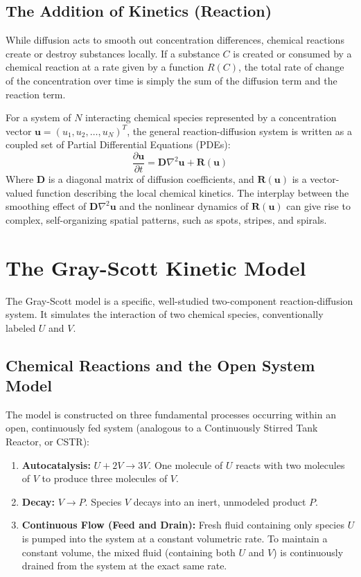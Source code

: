 \documentclass[12pt,a4paper]{article}
\begin{document}
\subsection{The Addition of Kinetics (Reaction)}
While diffusion acts to smooth out concentration differences, chemical reactions create or destroy substances locally. If a substance $C$ is created or consumed by a chemical reaction at a rate given by a function $R(C)$, the total rate of change of the concentration over time is simply the sum of the diffusion term and the reaction term. 

For a system of $N$ interacting chemical species represented by a concentration vector $\mathbf{u} = (u_1, u_2, \dots, u_N)^T$, the general reaction-diffusion system is written as a coupled set of Partial Differential Equations (PDEs):
$$\frac{\partial \mathbf{u}}{\partial t} = \mathbf{D} \nabla^2 \mathbf{u} + \mathbf{R}(\mathbf{u})$$
Where $\mathbf{D}$ is a diagonal matrix of diffusion coefficients, and $\mathbf{R}(\mathbf{u})$ is a vector-valued function describing the local chemical kinetics. The interplay between the smoothing effect of $\mathbf{D} \nabla^2 \mathbf{u}$ and the nonlinear dynamics of $\mathbf{R}(\mathbf{u})$ can give rise to complex, self-organizing spatial patterns, such as spots, stripes, and spirals.

\section{The Gray-Scott Kinetic Model}

The Gray-Scott model is a specific, well-studied two-component reaction-diffusion system. It simulates the interaction of two chemical species, conventionally labeled $U$ and $V$. 

\subsection{Chemical Reactions and the Open System Model}
The model is constructed on three fundamental processes occurring within an open, continuously fed system (analogous to a Continuously Stirred Tank Reactor, or CSTR):

\begin{enumerate}
    \item \textbf{Autocatalysis:} $U + 2V \rightarrow 3V$. One molecule of $U$ reacts with two molecules of $V$ to produce three molecules of $V$.
    \item \textbf{Decay:} $V \rightarrow P$. Species $V$ decays into an inert, unmodeled product $P$.
    \item \textbf{Continuous Flow (Feed and Drain):} Fresh fluid containing only species $U$ is pumped into the system at a constant volumetric rate. To maintain a constant volume, the mixed fluid (containing both $U$ and $V$) is continuously drained from the system at the exact same rate.
\end{enumerate}
\end{document}
